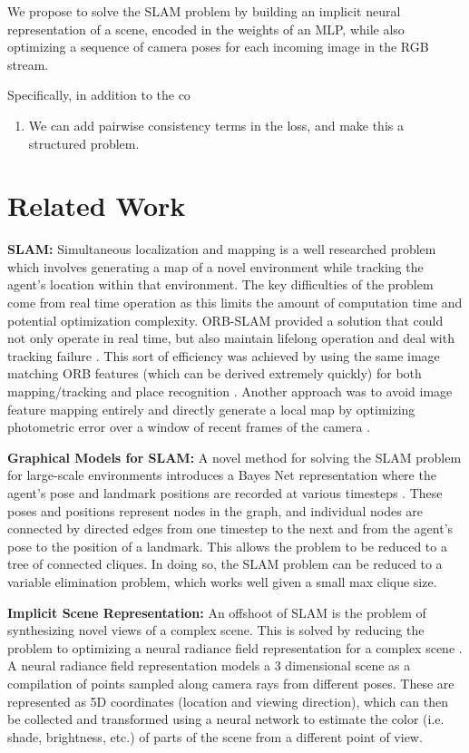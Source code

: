 \documentclass[15pt,letterpaper]{article}
\begin{document}
We propose to solve the SLAM problem by building an implicit neural representation of a scene, encoded in the weights of an MLP, while also optimizing a sequence of camera poses for each incoming image in the RGB stream.

Specifically, in addition to the co

\begin{enumerate}
    \item We can add pairwise consistency terms in the loss, and make this a  structured problem.
\end{enumerate}

\section{Related Work}%
\label{sec:Related Work}
{\bf SLAM:}
Simultaneous localization and mapping is a well researched problem which involves generating a map of a novel environment while tracking the agent's location within that environment. The key difficulties of the problem come from real time operation as this limits the amount of computation time and potential optimization complexity. ORB-SLAM provided a solution that could not only operate in real time, but also maintain lifelong operation and deal with tracking failure \cite{orb_slam}. This sort of efficiency was achieved by using the same image matching ORB features (which can be derived extremely quickly) for both mapping/tracking and place recognition \cite{orb}. Another approach was to avoid image feature mapping entirely and directly generate a local map by optimizing photometric error over a window of recent frames of the camera \cite{direct_odometry}.

{\bf Graphical Models for SLAM:}
A novel method for solving the SLAM problem for large-scale environments introduces a Bayes Net representation where the agent's pose and landmark positions are recorded at various timesteps \cite{isam2}. These poses and positions represent nodes in the graph, and individual nodes are connected by directed edges from one timestep to the next and from the agent's pose to the position of a landmark. This allows the problem to be reduced to a tree of connected cliques. In doing so, the SLAM problem can be reduced to a variable elimination problem, which works well given a small max clique size.

{\bf Implicit Scene Representation:}
An offshoot of SLAM is the problem of synthesizing novel views of a complex scene. This is solved by reducing the problem to optimizing a neural radiance field representation for a complex scene \cite{nerf}. A neural radiance field representation models a 3 dimensional scene as a compilation of points sampled along camera rays from different poses. These are represented as 5D coordinates (location and viewing direction), which can then be collected and transformed using a neural network to estimate the color (i.e. shade, brightness, etc.) of parts of the scene from a different point of view.
\end{document}
